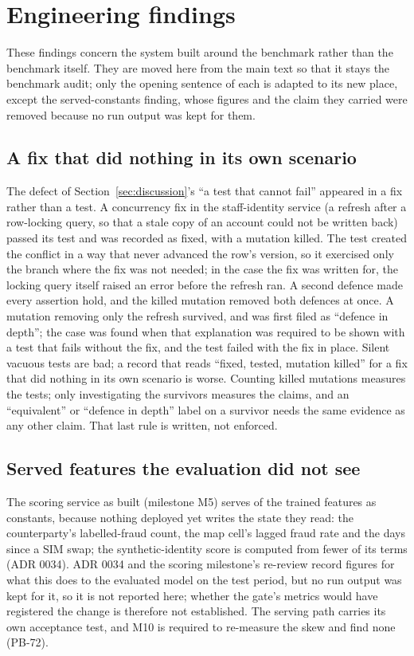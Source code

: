 \section{Engineering findings}
\label{app:engineering}

These findings concern the system built around the benchmark rather than the benchmark itself. They
are moved here from the main text so that it stays the benchmark audit; only the opening sentence of
each is adapted to its new place, except the served-constants finding, whose figures and the claim
they carried were removed because no run output was kept for them.

\subsection*{A fix that did nothing in its own scenario}

The defect of Section~\ref{sec:discussion}'s ``a test that cannot fail'' appeared in a fix rather
than a test. A concurrency fix in the
staff-identity service (a refresh after a row-locking query, so that a stale copy of an account could
not be written back) passed its test and was recorded as fixed, with a mutation killed. The test
created the conflict in a way that never advanced the row's version, so it exercised only the branch
where the fix was not needed; in the case the fix was written for, the locking query itself raised an
error before the refresh ran. A second defence made every assertion hold, and the killed mutation
removed both defences at once. A mutation removing only the refresh survived, and was first filed as
``defence in depth''; the case was found when that explanation was required to be shown with a test
that fails without the fix, and the test failed with the fix in place. Silent vacuous tests are bad; a
record that reads ``fixed, tested, mutation killed'' for a fix that did nothing in its own scenario is
worse. Counting killed mutations measures the tests; only investigating the survivors measures the
claims, and an ``equivalent'' or ``defence in depth'' label on a survivor needs the same evidence as
any other claim. That last rule is written, not enforced.

\subsection*{Served features the evaluation did not see}
 The scoring service as built (milestone
M5) serves \nSkewConstantFeatures{} of the trained features as constants, because nothing deployed yet
writes the state they read: the counterparty's labelled-fraud count, the map cell's lagged fraud
rate and the days since a SIM swap; the synthetic-identity score is computed from fewer of its terms
(ADR 0034). ADR 0034 and the scoring milestone's re-review record figures for what this does to
the evaluated model on the test period, but no run output was kept for it, so it is not reported
here; whether the gate's metrics would have registered the change is therefore not established. The
serving path carries its own acceptance test, and M10 is required to re-measure the skew and find
none (PB-72).

